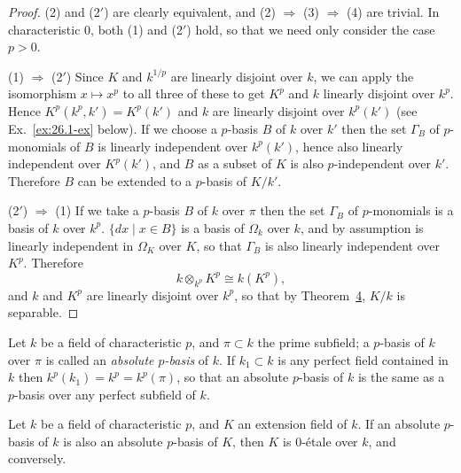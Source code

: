 \begin{proof}
(2) and (2$'$) are clearly equivalent, and (2) $\Rightarrow$ (3) $\Rightarrow$ (4) are trivial. In
characteristic $0$, both (1) and (2$'$) hold, so that we need only consider the case
$p > 0$.

(1) $\Rightarrow$ (2$'$) Since $K$ and $k^{1/p}$ are linearly disjoint over $k$, we can apply the
isomorphism $x \mapsto x^p$ to all three of these to get $K^p$ and $k$ linearly disjoint
over $k^p$. Hence $K^p(k^p, k') = K^p(k')$ and $k$ are linearly disjoint over
$k^p(k')$ (see Ex.~\ref{ex:26.1-ex} below). If we choose a $p$-basis $B$ of $k$ over $k'$ then
the set $\Gamma_B$ of $p$-monomials of $B$ is linearly independent over $k^p(k')$, hence
also linearly independent over $K^p(k')$, and $B$ as a subset of $K$ is also
$p$-independent over $k'$. Therefore $B$ can be extended to a $p$-basis of $K/k'$.

(2$'$) $\Rightarrow$ (1) If we take a $p$-basis $B$ of $k$ over $\pi$ then the set $\Gamma_B$ of
$p$-monomials is a basis of $k$ over $k^p$. $\{dx \mid x \in B\}$ is a basis of $\Omega_k$ over
$k$, and by assumption is linearly independent in $\Omega_K$ over $K$, so that
$\Gamma_B$ is also linearly independent over $K^p$. Therefore
\[
  k \otimes_{k^p} K^p \cong k(K^p),
\]
and $k$ and $K^p$ are linearly disjoint over $k^p$, so that by
Theorem~\hyperref[thm:26.4]{4}, $K/k$ is separable.
\end{proof}

Let $k$ be a field of characteristic $p$, and $\pi \subset k$ the prime subfield; a $p$-basis
of $k$ over $\pi$ is called an \emph{absolute $p$-basis} of $k$. If $k_1 \subset k$ is any perfect field
contained in $k$ then $k^p(k_1) = k^p = k^p(\pi)$, so that an absolute $p$-basis of $k$ is
the same as a $p$-basis over any perfect subfield of $k$.

\begin{theorem}\label{thm:26.7}
Let $k$ be a field of characteristic $p$, and $K$ an extension field of $k$. If an
absolute $p$-basis of $k$ is also an absolute $p$-basis of $K$, then $K$ is 0-\'etale over
$k$, and conversely.
\end{theorem}

